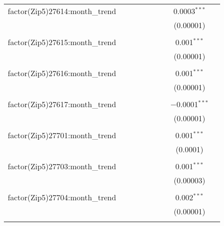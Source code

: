 \begin{table}[H]
{\begin{tabular}{@{\extracolsep{5pt}}lcccccccc}
  factor(Zip5)27614:month\_trend &  &  &  &  &  &  & 0.0003$^{***}$ &  \\  

   &  &  &  &  &  &  & (0.00001) &  \\  

   & & & & & & & & \\  

  factor(Zip5)27615:month\_trend &  &  &  &  &  &  & 0.001$^{***}$ &  \\  

   &  &  &  &  &  &  & (0.00001) &  \\  

   & & & & & & & & \\  

  factor(Zip5)27616:month\_trend &  &  &  &  &  &  & 0.001$^{***}$ &  \\  

   &  &  &  &  &  &  & (0.00001) &  \\  

   & & & & & & & & \\  

  factor(Zip5)27617:month\_trend &  &  &  &  &  &  & $-$0.0001$^{***}$ &  \\  

   &  &  &  &  &  &  & (0.00001) &  \\  

   & & & & & & & & \\  

  factor(Zip5)27701:month\_trend &  &  &  &  &  &  & 0.001$^{***}$ &  \\  

   &  &  &  &  &  &  & (0.0001) &  \\  

   & & & & & & & & \\  

  factor(Zip5)27703:month\_trend &  &  &  &  &  &  & 0.001$^{***}$ &  \\  

   &  &  &  &  &  &  & (0.00003) &  \\  

   & & & & & & & & \\  

  factor(Zip5)27704:month\_trend &  &  &  &  &  &  & 0.002$^{***}$ &  \\  

   &  &  &  &  &  &  & (0.00001) &  \\  

   & & & & & & & & \\  


\end{tabular}}
\end{table}
